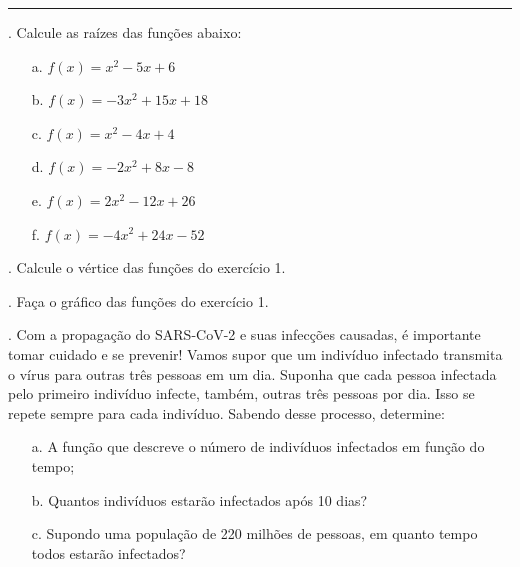 \documentclass{article}
\newcommand{\resposta}{\hfill\makebox[0pt][r]{\scriptsize\textit{Resposta:\rule{5cm}{.1pt}}}\\ \vspace{.1cm}}
\begin{document}
\par\noindent\rule{\textwidth}{1pt}

\vspace{0.25 cm}

. Calcule as raízes das funções abaixo:
\begin{itemize}
	\item[a.]{$f(x)=x^2-5x+6$}
	\item[b.]{$f(x)=-3x^2+15x+18$}
	\item[c.]{$f(x)=x^2-4x+4$}
	\item[d.]{$f(x)=-2x^2+8x-8$}
	\item[e.]{$f(x)=2x^2-12x+26$}
	\item[f.]{$f(x)=-4x^2+24x-52$}
\end{itemize}

. Calcule o vértice das funções do exercício 1.

. Faça o gráfico das funções do exercício 1.

. Com a propagação do SARS-CoV-2 e suas infecções causadas, é importante tomar cuidado e se prevenir! Vamos supor que um indivíduo infectado transmita o vírus para outras três pessoas em um dia. Suponha que cada pessoa infectada pelo primeiro indivíduo infecte, também, outras três pessoas por dia. Isso se repete sempre para cada indivíduo. Sabendo desse processo, determine:
\begin{itemize}
	\item[a.]{A função que descreve o número de indivíduos infectados em função do tempo;}
	\item[b.]{Quantos indivíduos estarão infectados após 10 dias?}
	\item[c.]{Supondo uma população de 220 milhões de pessoas, em quanto tempo todos estarão infectados?}
\end{itemize}
\end{document}
